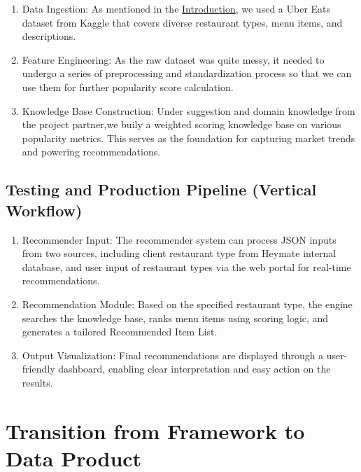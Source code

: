 \documentclass[
  11pt,
  a4paper,
  DIV=11,
  numbers=noendperiod]{scrartcl}
\providecommand{\tightlist}{%
  \setlength{\itemsep}{0pt}\setlength{\parskip}{0pt}}\usepackage{longtable,booktabs,array}
\begin{document}
\begin{enumerate}
\def\labelenumi{\arabic{enumi}.}
\tightlist
\item
  Data Ingestion: As mentioned in the
  \hyperref[introduction]{Introduction}, we used a Uber Eats dataset
  from Kaggle that covers diverse restaurant types, menu items, and
  descriptions.
\item
  Feature Engineering: As the raw dataset was quite messy, it needed to
  undergo a series of preprocessing and standardization process so that
  we can use them for further popularity score calculation.
\item
  Knowledge Base Construction: Under suggestion and domain knowledge
  from the project partner,we buily a weighted scoring knowledge base on
  various popularity metrics. This serves as the foundation for
  capturing market trends and powering recommendations.
\end{enumerate}

\subsection{Testing and Production Pipeline (Vertical
Workflow)}\label{testing-and-production-pipeline-vertical-workflow}

\begin{enumerate}
\def\labelenumi{\arabic{enumi}.}
\tightlist
\item
  Recommender Input: The recommender system can process JSON inputs from
  two sources, including client restaurant type from Heymate internal
  database, and user input of restaurant types via the web portal for
  real-time recommendations.
\item
  Recommendation Module: Based on the specified restaurant type, the
  engine searches the knowledge base, ranks menu items using scoring
  logic, and generates a tailored Recommended Item List.
\item
  Output Visualization: Final recommendations are displayed through a
  user-friendly dashboard, enabling clear interpretation and easy action
  on the results.
\end{enumerate}

\newpage

\section{Transition from Framework to Data
Product}\label{transition-from-framework-to-data-product}
\end{document}
